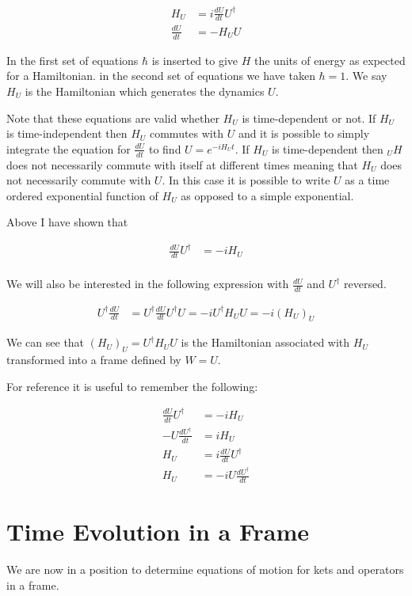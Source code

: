 \documentclass[12pt]{article}
\newcommand{\ddt}[1]{\frac{d #1}{dt}}
\begin{document}
\begin{align}
H_U &= i \ddt{U}U^{\dag}\\
\ddt{U} &= - H_U U
\end{align}

In the first set of equations $\hbar$ is inserted to give $H$ the units of energy as expected for a Hamiltonian. in the second set of equations we have taken $\hbar = 1$. We say $H_U$ is the Hamiltonian which generates the dynamics $U$.

Note that these equations are valid whether $H_U$ is time-dependent or not. If $H_U$ is time-independent then $H_U$ commutes with $U$ and it is possible to simply integrate the equation for $\ddt{U}$ to find $U=e^{-iH_Ut}$. If $H_U$ is time-dependent then $_UH$ does not necessarily commute with itself at different times meaning that $H_U$ does not necessarily commute with $U$. In this case it is possible to write $U$ as a time ordered exponential function of $H_U$ as opposed to a simple exponential. 

Above I have shown that

\begin{align}
\ddt{U}U^{\dag} &= -iH_U\\
\end{align}

We will also be interested in the following expression with $\ddt{U}$ and $U^{\dag}$ reversed.

\begin{align}
U^{\dag}\ddt{U} &= U^{\dag}\ddt{U} U^{\dag} U = -iU^{\dag} H_U U = -i(H_U)_U
\end{align}

We can see that $(H_U)_U = U^{\dag} H_U U$ is the Hamiltonian associated with $H_U$ transformed into a frame defined by $W=U$.

For reference it is useful to remember the following:

\begin{align}
\ddt{U}U^{\dag} &= -iH_U\\
-U\ddt{U^{\dag}} &= iH_U\\
H_U &= i \ddt{U}U^{\dag}\\
H_U &= -iU\ddt{U^{\dag}}
\end{align}

\section{Time Evolution in a Frame}

We are now in a position to determine equations of motion for kets and operators in a frame.
\end{document}
